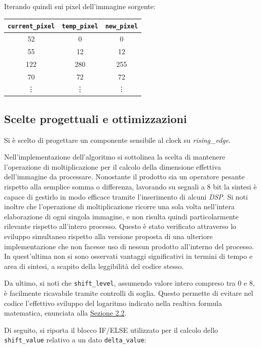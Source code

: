 \documentclass{article}
\begin{document}
Iterando quindi sui pixel dell'immagine sorgente:
\begin{center}
    \small
    \def\arraystretch{1.2} %
    \begin{tabular}{||c|c|c||} 
        \hline
        \texttt{current\_pixel} & \texttt{temp\_pixel} & \texttt{new\_pixel}\\
        \hline \hline
        52       & 0         & 0         \\\hline
        55       & 12        & 12        \\\hline
        122      & 280       & 255       \\\hline
        70       & 72        & 72        \\\hline
        \vdots   & \vdots    & \vdots    \\\hline
    \end{tabular}        
\end{center}
\vspace{0,2cm}

\subsection{Scelte progettuali e ottimizzazioni} %
Si è scelto di progettare un componente sensibile al clock su \emph{rising\_edge}.\par
Nell’implementazione dell’algoritmo si sottolinea la scelta di mantenere l’operazione di moltiplicazione per il calcolo della dimensione effettiva dell’immagine da processare. Nonostante il prodotto sia un operatore pesante rispetto alla semplice somma o differenza, lavorando su segnali a 8 bit la sintesi è capace di gestirlo in modo efficace tramite l’inserimento di alcuni \emph{DSP}\footnotemark.
Si noti inoltre che l’operazione di moltiplicazione ricorre una sola volta nell’intera elaborazione di ogni singola immagine, e non risulta quindi particolarmente rilevante rispetto all’intero processo. Questo è stato verificato attraverso lo sviluppo simultaneo rispetto alla versione proposta di una ulteriore implementazione che non facesse uso di nessun prodotto all’interno del processo. In quest’ultima non si sono osservati vantaggi significativi in termini di tempo e area di sintesi, a scapito della leggibilità del codice stesso.\par
Da ultimo, si noti che \texttt{shift\_level}, assumendo valore intero compreso tra 0 e 8, è facilmente ricavabile tramite controlli di soglia. Questo permette di evitare nel codice l’effettivo sviluppo del logaritmo indicato nella realtiva formula matematica, enunciata alla \hyperref[sec:appr]{Sezione 2.2}.\par 
Di seguito, si riporta il blocco IF/ELSE utilizzato per il calcolo dello \texttt{shift\_value} relativo a un dato \texttt{delta\_value}:
\end{document}
